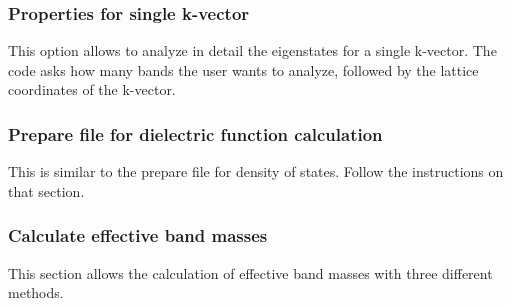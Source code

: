 \documentclass[11pt]{article}
\begin{document}
\subsubsection{Properties for single k-vector}

This option allows to analyze in detail the eigenstates for a single k-vector.
The code asks how many bands the user wants to analyze, followed by
the lattice coordinates of the k-vector.

\subsubsection{Prepare file for dielectric function calculation}

This is similar to the prepare file for density of states.  Follow the instructions
on that section.

\subsubsection{Calculate effective band masses}

This section allows the calculation of effective band masses with three different methods.
\end{document}
